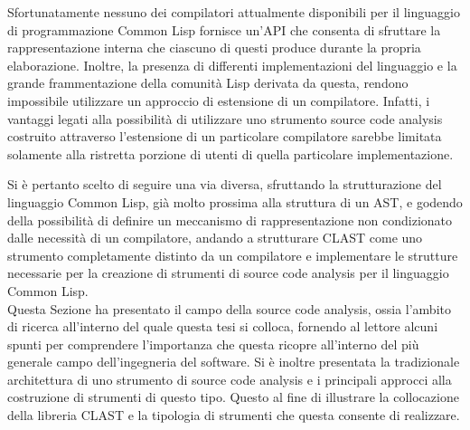 Sfortunatamente nessuno dei compilatori attualmente disponibili per il
linguaggio di programmazione Common Lisp fornisce un'API che consenta di
sfruttare la rappresentazione interna che ciascuno di questi produce durante la
propria elaborazione. Inoltre, la presenza di differenti implementazioni del
linguaggio e la grande frammentazione della comunità Lisp derivata da questa,
rendono impossibile utilizzare un approccio di estensione di un compilatore.
Infatti, i vantaggi legati alla possibilità di utilizzare uno strumento source
code analysis costruito attraverso l'estensione di un particolare compilatore
sarebbe limitata solamente alla ristretta porzione di utenti di quella
particolare implementazione.

Si è pertanto scelto di seguire una via diversa, sfruttando la strutturazione
del linguaggio Common Lisp, già molto prossima alla struttura di un AST, e
godendo della possibilità di definire un meccanismo di rappresentazione non
condizionato dalle necessità di un compilatore, andando a strutturare CLAST
come uno strumento completamente distinto da un compilatore e implementare le
strutture necessarie per la creazione di strumenti di source code analysis per
il linguaggio Common Lisp.\\

Questa Sezione ha presentato il campo della source code analysis, ossia l'ambito
di ricerca all'interno del quale questa tesi si colloca, fornendo al lettore
alcuni spunti per comprendere l'importanza che questa ricopre all'interno del
più generale campo dell'ingegneria del software. Si è inoltre presentata la
tradizionale architettura di uno strumento di source code analysis e i
principali approcci alla costruzione di strumenti di questo tipo. Questo al fine
di illustrare la collocazione della libreria CLAST e la tipologia di strumenti
che questa consente di realizzare.

